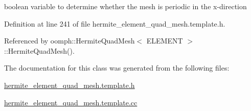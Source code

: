 boolean variable to determine whether the mesh is periodic in the x-\/direction 



Definition at line 241 of file hermite\+\_\+element\+\_\+quad\+\_\+mesh.\+template.\+h.



Referenced by oomph\+::\+Hermite\+Quad\+Mesh$<$ E\+L\+E\+M\+E\+N\+T $>$\+::\+Hermite\+Quad\+Mesh().



The documentation for this class was generated from the following files\+:\begin{DoxyCompactItemize}
\item 
\hyperlink{hermite__element__quad__mesh_8template_8h}{hermite\+\_\+element\+\_\+quad\+\_\+mesh.\+template.\+h}\item 
\hyperlink{hermite__element__quad__mesh_8template_8cc}{hermite\+\_\+element\+\_\+quad\+\_\+mesh.\+template.\+cc}\end{DoxyCompactItemize}
